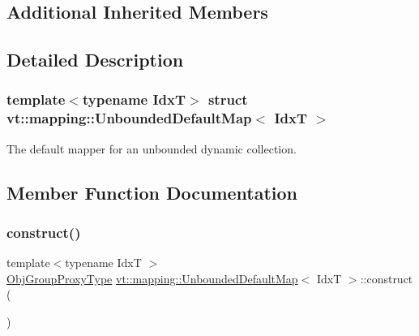 \subsection*{Additional Inherited Members}


\subsection{Detailed Description}
\subsubsection*{template$<$typename IdxT$>$\newline
struct vt\+::mapping\+::\+Unbounded\+Default\+Map$<$ Idx\+T $>$}

The default mapper for an unbounded dynamic collection. 

\subsection{Member Function Documentation}
\mbox{\label{structvt_1_1mapping_1_1_unbounded_default_map_aeb005e2e45f45fcd17548ee10e66862b}} 
\subsubsection{\texorpdfstring{construct()}{construct()}}
{\footnotesize\ttfamily template$<$typename IdxT $>$ \\
\hyperlink{namespacevt_ad7cae989df485fccca57f0792a880a8e}{Obj\+Group\+Proxy\+Type} \hyperlink{structvt_1_1mapping_1_1_unbounded_default_map}{vt\+::mapping\+::\+Unbounded\+Default\+Map}$<$ IdxT $>$\+::construct (\begin{DoxyParamCaption}{ }\end{DoxyParamCaption})\hspace{0.3cm}{\ttfamily [static]}}

\mbox{\label{structvt_1_1mapping_1_1_unbounded_default_map_a8617e6a789985a7140d09a8be6bc3a47}} 
